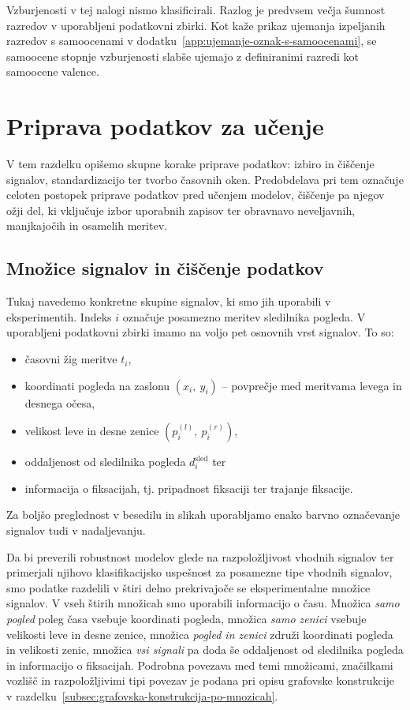 Vzburjenosti v tej nalogi nismo klasificirali.
Razlog je predvsem večja šumnost razredov v uporabljeni podatkovni zbirki.
Kot kaže prikaz ujemanja izpeljanih razredov s samoocenami v dodatku~\ref{app:ujemanje-oznak-s-samoocenami}, se samoocene stopnje vzburjenosti slabše ujemajo z definiranimi razredi kot samoocene valence.

\section{Priprava podatkov za učenje}
\label{subsec:vhodni-signali}

V tem razdelku opišemo skupne korake priprave podatkov: izbiro in čiščenje signalov, standardizacijo ter tvorbo časovnih oken.
Predobdelava pri tem označuje celoten postopek priprave podatkov pred učenjem modelov, čiščenje pa njegov ožji del, ki vključuje izbor uporabnih zapisov ter obravnavo neveljavnih, manjkajočih in osamelih meritev.

\subsection{Množice signalov in čiščenje podatkov}

Tukaj navedemo konkretne skupine signalov, ki smo jih uporabili v eksperimentih.
Indeks $i$ označuje posamezno meritev sledilnika pogleda.
V uporabljeni podatkovni zbirki imamo na voljo pet osnovnih vrst signalov. To so:
\begin{itemize}
    \item časovni žig meritve \textcolor{tableTime}{$t_i$},
    \item koordinati pogleda na zaslonu \textcolor{tableGaze}{$(x_i,~y_i)$} -- povprečje med meritvama levega in desnega očesa,
    \item velikost leve in desne zenice \textcolor{tablePupil}{$(p_i^{(l)},~p_i^{(r)})$},
    \item oddaljenost od sledilnika pogleda \textcolor{tableFixation}{$d_i^{\text{sled}}$} ter
    \item \textcolor{tableFixation}{informacija o fiksacijah}, tj. pripadnost fiksaciji ter trajanje fiksacije.
\end{itemize}
Za boljšo preglednost v besedilu in slikah uporabljamo enako barvno označevanje signalov tudi v nadaljevanju.

Da bi preverili robustnost modelov glede na razpoložljivost vhodnih signalov ter primerjali njihovo klasifikacijsko uspešnost za posamezne tipe vhodnih signalov, smo podatke \MAHNOB{} razdelili v štiri delno prekrivajoče se eksperimentalne množice signalov.
V vseh štirih množicah smo uporabili informacijo o času.
Množica \emph{samo pogled} poleg časa vsebuje koordinati pogleda, množica \emph{samo zenici} vsebuje velikosti leve in desne zenice, množica \emph{pogled in zenici} združi koordinati pogleda in velikosti zenic, množica \emph{vsi signali} pa doda še oddaljenost od sledilnika pogleda in informacijo o fiksacijah.
Podrobna povezava med temi množicami, značilkami vozlišč in razpoložljivimi tipi povezav je podana pri opisu grafovske konstrukcije v razdelku~\ref{subsec:grafovska-konstrukcija-po-mnozicah}.

